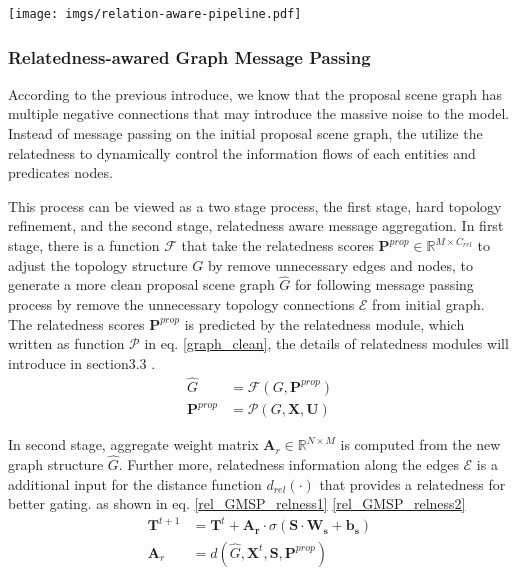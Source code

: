 \begin{figure*}
    \centering
    \texttt{[image: imgs/relation-aware-pipeline.pdf]}
    \caption{} 
    \label{}
\end{figure*}


\subsubsection{Relatedness-awared Graph Message Passing}
According to the previous introduce, we know that the proposal scene graph has multiple negative connections that may introduce the massive noise to the model.
Instead of message passing on the initial proposal scene graph, the utilize the relatedness to dynamically control the information flows of each entities and predicates nodes.

This process can be viewed as a two stage process, the first stage, hard topology refinement, and the second stage, relatedness aware message aggregation.
In first stage, there is a function $\mathcal{F}$ that take the relatedness scores $\mathbf{P}^{prop} \in \mathbb{R}^{M \times C_{rel}}$ to adjust the topology structure $G$ by remove unnecessary edges and nodes, to generate a more clean proposal scene graph $\hat{G}$ for following message passing process by remove the unnecessary topology connections $\mathcal{E}$ from initial graph.
The relatedness scores $\mathbf{P}^{prop} $ is predicted by the relatedness module, which written as function $\mathcal{P}$ in eq. \ref{graph_clean}, the details of relatedness modules will introduce in section3.3 .
\begin{align}
    \hat{G} &= \mathcal{F}(G, \mathbf{P}^{prop})  \\
    \mathbf{P}^{prop} &= \mathcal{P}(G, \mathbf{X}, \mathbf{U})
    \label{graph_clean}
\end{align}


In second stage, aggregate weight matrix $\mathbf{A}_r \in \mathbb{R}^{N \times M}$ is computed from the new graph structure $\hat{G}$. 
Further more, relatedness information along the edges $\mathcal{E}$ is a additional input for the distance function $d_{rel}(\cdot)$ that provides a relatedness for better gating. as shown in eq.
\ref{rel_GMSP_relness1} \ref{rel_GMSP_relness2}
\begin{align}
    \mathbf{T}^{t+1} &= \mathbf{T}^{t} + \mathbf{A_r} \cdot \sigma (\mathbf{S} \cdot  \mathbf{W_s}  + \mathbf{b_s})  \label{rel_GMSP_relness1}  \\
    \mathbf{A}_r &= d(\hat{G}, \mathbf{X}^{t}, \mathbf{S}, \mathbf{P}^{prop}) 
\label{rel_GMSP_relness2} 
\end{align}


